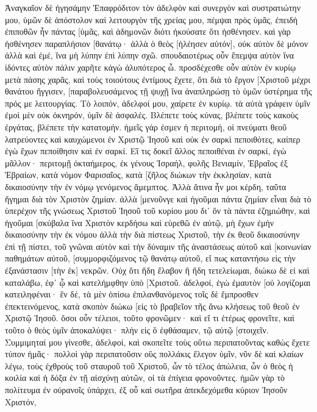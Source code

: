 Ἀναγκαῖον δὲ ἡγησάμην Ἐπαφρόδιτον τὸν ἀδελφὸν καὶ συνεργὸν καὶ συστρατιώτην μου, ὑμῶν δὲ ἀπόστολον καὶ λειτουργὸν τῆς χρείας μου, πέμψαι πρὸς ὑμᾶς, 
ἐπειδὴ ἐπιποθῶν ἦν πάντας [ὑμᾶς, καὶ ἀδημονῶν διότι ἠκούσατε ὅτι ἠσθένησεν. 
καὶ γὰρ ἠσθένησεν παραπλήσιον [θανάτῳ· ἀλλὰ ὁ θεὸς [ἠλέησεν αὐτόν], οὐκ αὐτὸν δὲ μόνον ἀλλὰ καὶ ἐμέ, ἵνα μὴ λύπην ἐπὶ λύπην σχῶ. 
σπουδαιοτέρως οὖν ἔπεμψα αὐτὸν ἵνα ἰδόντες αὐτὸν πάλιν χαρῆτε κἀγὼ ἀλυπότερος ὦ. 
προσδέχεσθε οὖν αὐτὸν ἐν κυρίῳ μετὰ πάσης χαρᾶς, καὶ τοὺς τοιούτους ἐντίμους ἔχετε, 
ὅτι διὰ τὸ ἔργον [Χριστοῦ μέχρι θανάτου ἤγγισεν, [παραβολευσάμενος τῇ ψυχῇ ἵνα ἀναπληρώσῃ τὸ ὑμῶν ὑστέρημα τῆς πρός με λειτουργίας. 
Τὸ λοιπόν, ἀδελφοί μου, χαίρετε ἐν κυρίῳ. τὰ αὐτὰ γράφειν ὑμῖν ἐμοὶ μὲν οὐκ ὀκνηρόν, ὑμῖν δὲ ἀσφαλές. 
Βλέπετε τοὺς κύνας, βλέπετε τοὺς κακοὺς ἐργάτας, βλέπετε τὴν κατατομήν. 
ἡμεῖς γάρ ἐσμεν ἡ περιτομή, οἱ πνεύματι θεοῦ λατρεύοντες καὶ καυχώμενοι ἐν Χριστῷ Ἰησοῦ καὶ οὐκ ἐν σαρκὶ πεποιθότες, 
καίπερ ἐγὼ ἔχων πεποίθησιν καὶ ἐν σαρκί. Εἴ τις δοκεῖ ἄλλος πεποιθέναι ἐν σαρκί, ἐγὼ μᾶλλον· 
περιτομῇ ὀκταήμερος, ἐκ γένους Ἰσραήλ, φυλῆς Βενιαμίν, Ἑβραῖος ἐξ Ἑβραίων, κατὰ νόμον Φαρισαῖος, 
κατὰ [ζῆλος διώκων τὴν ἐκκλησίαν, κατὰ δικαιοσύνην τὴν ἐν νόμῳ γενόμενος ἄμεμπτος. 
Ἀλλὰ ἅτινα ἦν μοι κέρδη, ταῦτα ἥγημαι διὰ τὸν Χριστὸν ζημίαν. 
ἀλλὰ [μενοῦνγε καὶ ἡγοῦμαι πάντα ζημίαν εἶναι διὰ τὸ ὑπερέχον τῆς γνώσεως Χριστοῦ Ἰησοῦ τοῦ κυρίου μου δι᾽ ὃν τὰ πάντα ἐζημιώθην, καὶ ἡγοῦμαι [σκύβαλα ἵνα Χριστὸν κερδήσω 
καὶ εὑρεθῶ ἐν αὐτῷ, μὴ ἔχων ἐμὴν δικαιοσύνην τὴν ἐκ νόμου ἀλλὰ τὴν διὰ πίστεως Χριστοῦ, τὴν ἐκ θεοῦ δικαιοσύνην ἐπὶ τῇ πίστει, 
τοῦ γνῶναι αὐτὸν καὶ τὴν δύναμιν τῆς ἀναστάσεως αὐτοῦ καὶ [κοινωνίαν παθημάτων αὐτοῦ, [συμμορφιζόμενος τῷ θανάτῳ αὐτοῦ, 
εἴ πως καταντήσω εἰς τὴν ἐξανάστασιν [τὴν ἐκ] νεκρῶν. 
Οὐχ ὅτι ἤδη ἔλαβον ἢ ἤδη τετελείωμαι, διώκω δὲ εἰ καὶ καταλάβω, ἐφ᾽ ᾧ καὶ κατελήμφθην ὑπὸ [Χριστοῦ. 
ἀδελφοί, ἐγὼ ἐμαυτὸν [οὐ λογίζομαι κατειληφέναι· ἓν δέ, τὰ μὲν ὀπίσω ἐπιλανθανόμενος τοῖς δὲ ἔμπροσθεν ἐπεκτεινόμενος, 
κατὰ σκοπὸν διώκω [εἰς τὸ βραβεῖον τῆς ἄνω κλήσεως τοῦ θεοῦ ἐν Χριστῷ Ἰησοῦ. 
ὅσοι οὖν τέλειοι, τοῦτο φρονῶμεν· καὶ εἴ τι ἑτέρως φρονεῖτε, καὶ τοῦτο ὁ θεὸς ὑμῖν ἀποκαλύψει· 
πλὴν εἰς ὃ ἐφθάσαμεν, τῷ αὐτῷ [στοιχεῖν. 
Συμμιμηταί μου γίνεσθε, ἀδελφοί, καὶ σκοπεῖτε τοὺς οὕτω περιπατοῦντας καθὼς ἔχετε τύπον ἡμᾶς· 
πολλοὶ γὰρ περιπατοῦσιν οὓς πολλάκις ἔλεγον ὑμῖν, νῦν δὲ καὶ κλαίων λέγω, τοὺς ἐχθροὺς τοῦ σταυροῦ τοῦ Χριστοῦ, 
ὧν τὸ τέλος ἀπώλεια, ὧν ὁ θεὸς ἡ κοιλία καὶ ἡ δόξα ἐν τῇ αἰσχύνῃ αὐτῶν, οἱ τὰ ἐπίγεια φρονοῦντες. 
ἡμῶν γὰρ τὸ πολίτευμα ἐν οὐρανοῖς ὑπάρχει, ἐξ οὗ καὶ σωτῆρα ἀπεκδεχόμεθα κύριον Ἰησοῦν Χριστόν, 
